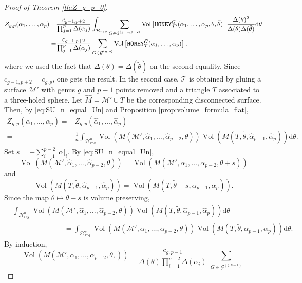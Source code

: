 \documentclass[11pt,a4paper]{amsart}
\providecommand{\diff}{\mathrm d}
\providecommand{\Vol}{\operatorname{Vol}}
\providecommand{\honey}{\texttt{\textsc{HONEY}}}
\numberwithin{equation}{section}
\theoremstyle{definition}
\begin{document}
\begin{proof}[Proof of Theorem \ref{th:Z_g_p_0}]
\begin{align*}
Z_{g,p}(\alpha_1,\dots,\alpha_p)=
&\frac{c_{g-1,p+2}}{\prod_{j=1}^{p}\Delta(\alpha_j)}
\int_{\mathcal{H}_{reg}}\sum_{\substack{G \in \mathcal{G}^{(g-1,p+2)}}}
        \Vol \left[ \honey^G_{\mathcal{T'}}(\alpha_1, 
        \dots, \alpha_p,\theta,\tilde{\theta})\right]\frac{\Delta(\theta)^2}{\Delta(\theta)\Delta(\tilde{\theta})} \diff \theta\\
        =&\frac{c_{g-1,p+2}}{\prod_{j=1}^{p}\Delta(\alpha_j)}\sum_{\substack{G \in \mathcal{G}^{(g,p)}}}
        \Vol \left[ \honey^G_{\mathcal{T}}(\alpha_1, 
        \dots, \alpha_p) \right],
 \end{align*}
where we used the fact that $\Delta(\theta)=\Delta(\tilde{\theta})$ on the second equality. 
Since $c_{g-1, p+2} = c_{g, p}$, one gets the result.
In the second case, $\mathcal{T}$ is obtained by gluing a 
surface $\mathcal{M}'$ with genus $g$ and $p-1$ points removed and a triangle $T$ associated to a three-holed sphere. 
Let $\widehat{M}=\mathcal{M'}\cup T$ be the corresponding disconnected surface. Then, by \eqref{eq:SU_n_equal_Un} and Proposition \ref{prop:volume_formula_flat},
\begin{align*}
Z_{g,p}(\alpha_1,\dots,\alpha_p)=
&Z_{g,p}(\hat{\alpha}_1,\dots,\hat{\alpha}_p)\\
=&\frac{1}{n}\int_{\mathcal{H}_{reg}^0}\Vol(M(\mathcal{M}', \hat{\alpha}_1,\ldots,\hat{\alpha}_{p-2},\theta)) 
\Vol(M(T,\tilde{\theta},\hat{\alpha}_{p-1},\hat{\alpha}_p)) \diff \theta.
\end{align*}
Set $s=-\sum_{i=1}^{p-2}\vert \alpha\vert_i$. By \eqref{eq:SU_n_equal_Un},
$$\Vol(M(\mathcal{M}',\hat{\alpha}_1,\ldots,\hat{\alpha}_{p-2},\theta)) = 
\Vol(M(\mathcal{M}',\alpha_1,\ldots,\alpha_{p-2},\theta+s))$$
and
$$ \Vol(M(T,\tilde{\theta},\hat{\alpha}_{p-1},\hat{\alpha}_p))=\Vol(M(T,\tilde{\theta}-s,\alpha_{p-1},\alpha_p)).$$
Since the map $\theta\mapsto \theta-s$ is volume preserving,
\begin{align*}
&\int_{\mathcal{H}_{reg}^0}\Vol(M(\mathcal{M}',\hat{\alpha}_1,\ldots,\hat{\alpha}_{p-2},\theta)) 
\Vol(M(T,\tilde{\theta},\hat{\alpha}_{p-1},\hat{\alpha}_p)) \diff \theta\\
&\hspace{3cm}=\int_{\mathcal{H}_{reg}^{s}}\Vol(M(\mathcal{M}',\alpha_1,\ldots,\alpha_{p-2},\theta))
\Vol(M(T,\tilde{\theta},\alpha_{p-1},\alpha_p))\diff \theta.
\end{align*}
By induction,
$$\Vol(M(\mathcal{M}',\alpha_1,\ldots,\alpha_{p-2},\theta,)) = 
\frac{c_{g,p-1}}{\Delta(\theta)\prod_{i=1}^{p-2}\Delta(\alpha_i)}\sum_{\substack{G \in \mathcal{G}^{(g,p-1)}}}
$$
\end{proof}
\end{document}
